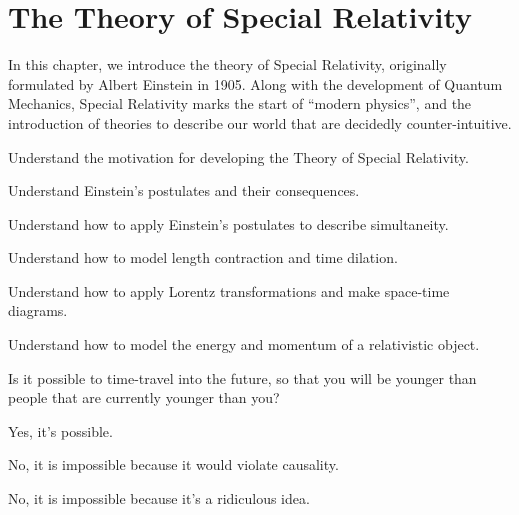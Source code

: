 \chapter{The Theory of Special Relativity}
\label{chap:specialrelativity}
In this chapter, we introduce the theory of Special Relativity, originally formulated by Albert Einstein in 1905. Along with the development of Quantum Mechanics, Special Relativity marks the start of ``modern physics'', and the introduction of theories to describe our world that are decidedly counter-intuitive. 
 \vspace{1cm}
\begin{learningObjectives}
{
\item Understand the motivation for developing the Theory of Special Relativity.
\item Understand Einstein's postulates and their consequences.
\item Understand how to apply Einstein's postulates to describe simultaneity.
\item Understand how to model length contraction and time dilation.
\item Understand how to apply Lorentz transformations and make space-time diagrams.
\item Understand how to model the energy and momentum of a relativistic object.
}
\end{learningObjectives}

\begin{opening}
\begin{MCquestion}{Is it possible to time-travel into the future, so that you will be younger than people that are currently younger than you?}
\item Yes, it's possible. \correct
\item No, it is impossible because it would violate causality.
\item No, it is impossible because it's a ridiculous idea.
\end{MCquestion}
\end{opening}

